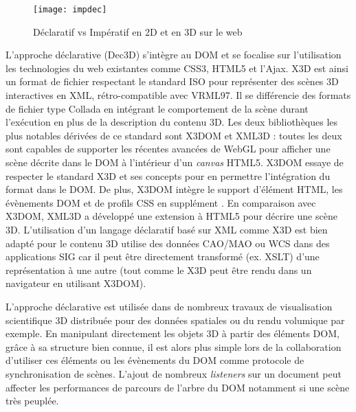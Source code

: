 \begin{figure}[hbt]
	\centering
	\texttt{[image: impdec]}
	\caption{Déclaratif vs Impératif en 2D et en 3D sur le web}
	\label{fig:impdec}
\end{figure}

L'approche déclarative (Dec3D) s'intègre au \gls{DOM} et se 
focalise sur l'utilisation les technologies du web existantes comme CSS3, 
\gls{HTML}5 et l'Ajax. 
X3D est ainsi un format de fichier respectant le standard ISO \cite{X3D2011} pour 
représenter des scènes 3D interactives en XML, rétro-compatible avec VRML97. Il 
se différencie des formats de fichier type Collada en intégrant le comportement de 
la scène durant l'exécution en plus de la description du contenu 3D. Les deux 
bibliothèques les plus notables dérivées de ce standard sont X3DOM 
\cite{Behr2010} et XML3D \cite{Sons2010} : toutes les deux sont capables de 
supporter les récentes avancées de WebGL pour afficher une scène décrite dans 
le \gls{DOM} à l'intérieur d'un \textit{canvas} \gls{HTML}5. 
X3DOM essaye de respecter le standard X3D et ses concepts pour en permettre 
l'intégration du format dans le \gls{DOM}. De plus, X3DOM intègre le support 
d'élément \gls{HTML}, les évènements \gls{DOM} et de profils \acrshort{CSS} en 
supplément \cite{Sutter2015}. 
En comparaison avec X3DOM, XML3D a développé une extension à \gls{HTML}5 
pour décrire une scène 3D. 
L'utilisation d'un langage déclaratif basé sur XML comme X3D est bien 
adapté pour le contenu 3D utilise des données CAO/MAO ou WCS dans des 
applications \gls{SIG} car il peut être directement transformé (ex. XSLT) d'une 
représentation à une autre (tout comme le X3D peut être rendu dans un navigateur 
en utilisant X3DOM). 

L'approche déclarative est utilisée dans de nombreux travaux de visualisation 
scientifique 3D distribuée \cite{Jung2012} pour des données spatiales 
\cite{Stein2014} ou du rendu volumique \cite{Becher2012} par exemple. 
En manipulant directement les objets 3D à partir des éléments \gls{DOM}, grâce à 
sa structure bien connue, il est alors plus simple lors de la collaboration d'utiliser 
ces éléments \cite{Gadea2016} ou les évènements du \gls{DOM} \cite{Lowet2009} 
comme protocole de synchronisation de scènes. 
L'ajout de nombreux \textit{listeners} sur un document peut affecter les 
performances de parcours de l'arbre du \gls{DOM} notamment si une scène 
très peuplée.

